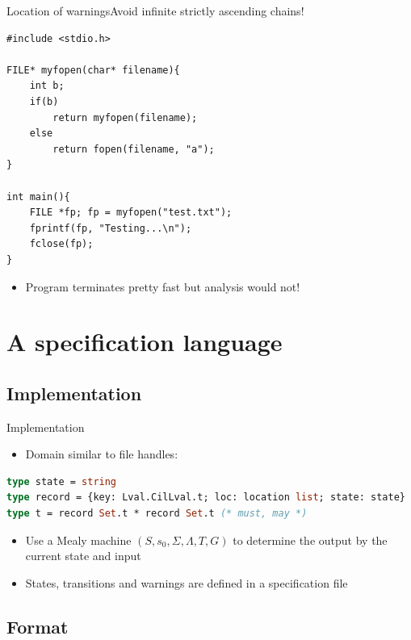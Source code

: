 \documentclass{beamer}
\begin{document}
\begin{frame}{Location of warnings}{Avoid infinite strictly ascending chains!}
\begin{lstlisting}
#include <stdio.h>

FILE* myfopen(char* filename){
    int b;
    if(b)
        return myfopen(filename);
    else
        return fopen(filename, "a");
}

int main(){
    FILE *fp; fp = myfopen("test.txt");
    fprintf(fp, "Testing...\n");
    fclose(fp);
}
\end{lstlisting}
\begin{itemize}
\item Program terminates pretty fast but analysis would not!
\end{itemize}
\end{frame}


\section{A specification language}

\subsection{Implementation}

\begin{frame}[fragile]{Implementation}
\begin{itemize}
\item Domain similar to file handles:
\end{itemize}
\begin{lstlisting}[language=ML]
type state = string
type record = {key: Lval.CilLval.t; loc: location list; state: state}
type t = record Set.t * record Set.t (* must, may *)
\end{lstlisting}
\begin{itemize}
\item Use a Mealy machine $(S, s_0, \Sigma, \Lambda, T, G)$ to determine the output by the current state and input
\item States, transitions and warnings are defined in a specification file
\end{itemize}
\end{frame}

\subsection{Format}
\end{document}
